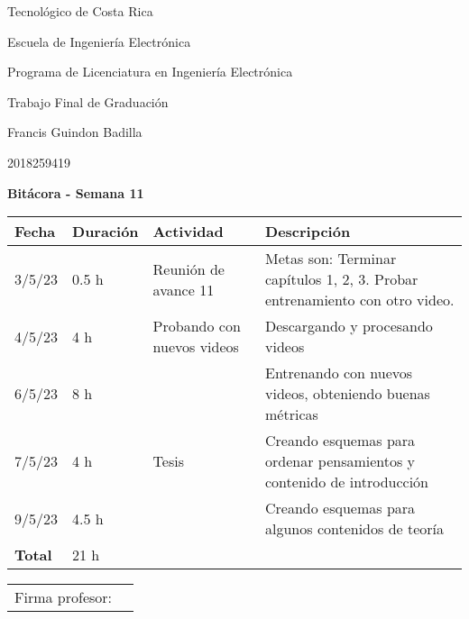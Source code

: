 \documentclass[12pt,oneside]{book}
\begin{document}
 \graphicspath{{./}{../tesis/fig/}}
  Tecnológico de Costa Rica
  \par\vspace{1mm}
  Escuela de Ingeniería Electrónica
  \par\vspace{1mm}
  Programa de Licenciatura en Ingeniería Electrónica
  \par\vspace{10mm}
  Trabajo Final de Graduación
  \par\vspace{1mm}
  Francis Guindon Badilla
  \par\vspace{1mm}
  2018259419
  \par\vspace{10mm}
  \large\textbf{Bitácora - Semana 11}
  \par\vspace{10mm}
  \small

  \begin{table} [!h]
    \centering
    \small
    \begin{tabular}{p{1.5 cm} p{2.1 cm} p{5 cm} p{8 cm}}
      \hline
      Fecha & Duración & Actividad & Descripción \\
      \hline
      3/5/23 & 0.5 h & Reunión de avance 11 & Metas son: Terminar capítulos 1, 2, 3. Probar entrenamiento con otro video.\\
      4/5/23 & 4 h & Probando con nuevos videos & Descargando y procesando videos\\
      6/5/23 & 8 h & & Entrenando con nuevos videos, obteniendo buenas métricas \\
      7/5/23 & 4 h & Tesis & Creando esquemas para ordenar pensamientos y contenido de introducción \\
      9/5/23 & 4.5 h & & Creando esquemas para algunos contenidos de teoría \\
      \hline
      \textbf{Total} & 21 h \\
      \hline
    \end{tabular}
  \end{table}
  
  \vfill

  \begin{tabular}{p{3 cm} p{10 cm}}
    Firma profesor: & \\
    \cline{2-2}
  \end{tabular}

  \newpage
\end{document}

